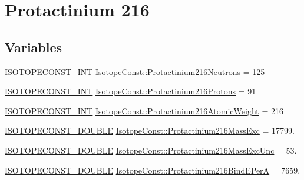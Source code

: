 \hypertarget{group___isotope_const-_protactinium-_pa216}{}\section{Protactinium 216}
\label{group___isotope_const-_protactinium-_pa216}
\subsection*{Variables}
\begin{DoxyCompactItemize}
\item 
\mbox{\hyperlink{group___isotope_const-_macros_ga5f18360b3e99483a35c32d789e62621c}{I\+S\+O\+T\+O\+P\+E\+C\+O\+N\+S\+T\+\_\+\+I\+NT}} \mbox{\hyperlink{group___isotope_const-_protactinium-_pa216_ga485e2a35c6dc770f2360e196aa43fd47}{Isotope\+Const\+::\+Protactinium216\+Neutrons}} = 125
\item 
\mbox{\hyperlink{group___isotope_const-_macros_ga5f18360b3e99483a35c32d789e62621c}{I\+S\+O\+T\+O\+P\+E\+C\+O\+N\+S\+T\+\_\+\+I\+NT}} \mbox{\hyperlink{group___isotope_const-_protactinium-_pa216_gab6eece5d0299d7e975290b4f1b242807}{Isotope\+Const\+::\+Protactinium216\+Protons}} = 91
\item 
\mbox{\hyperlink{group___isotope_const-_macros_ga5f18360b3e99483a35c32d789e62621c}{I\+S\+O\+T\+O\+P\+E\+C\+O\+N\+S\+T\+\_\+\+I\+NT}} \mbox{\hyperlink{group___isotope_const-_protactinium-_pa216_ga2c543462db5c22e8284d3194fa18f6b7}{Isotope\+Const\+::\+Protactinium216\+Atomic\+Weight}} = 216
\item 
\mbox{\hyperlink{group___isotope_const-_macros_ga8f45a7272ce02c0b4c65c44636ed719a}{I\+S\+O\+T\+O\+P\+E\+C\+O\+N\+S\+T\+\_\+\+D\+O\+U\+B\+LE}} \mbox{\hyperlink{group___isotope_const-_protactinium-_pa216_ga1015d9cdc513d97b7cc7937ecaed1eec}{Isotope\+Const\+::\+Protactinium216\+Mass\+Exc}} = 17799.
\item 
\mbox{\hyperlink{group___isotope_const-_macros_ga8f45a7272ce02c0b4c65c44636ed719a}{I\+S\+O\+T\+O\+P\+E\+C\+O\+N\+S\+T\+\_\+\+D\+O\+U\+B\+LE}} \mbox{\hyperlink{group___isotope_const-_protactinium-_pa216_ga67388744413e602e282c34ad263d1fa6}{Isotope\+Const\+::\+Protactinium216\+Mass\+Exc\+Unc}} = 53.
\item 
\mbox{\hyperlink{group___isotope_const-_macros_ga8f45a7272ce02c0b4c65c44636ed719a}{I\+S\+O\+T\+O\+P\+E\+C\+O\+N\+S\+T\+\_\+\+D\+O\+U\+B\+LE}} \mbox{\hyperlink{group___isotope_const-_protactinium-_pa216_ga6ada953bc779ceae2d9d6e0ddbeb2c12}{Isotope\+Const\+::\+Protactinium216\+Bind\+E\+PerA}} = 7659.

\end{DoxyCompactItemize}
